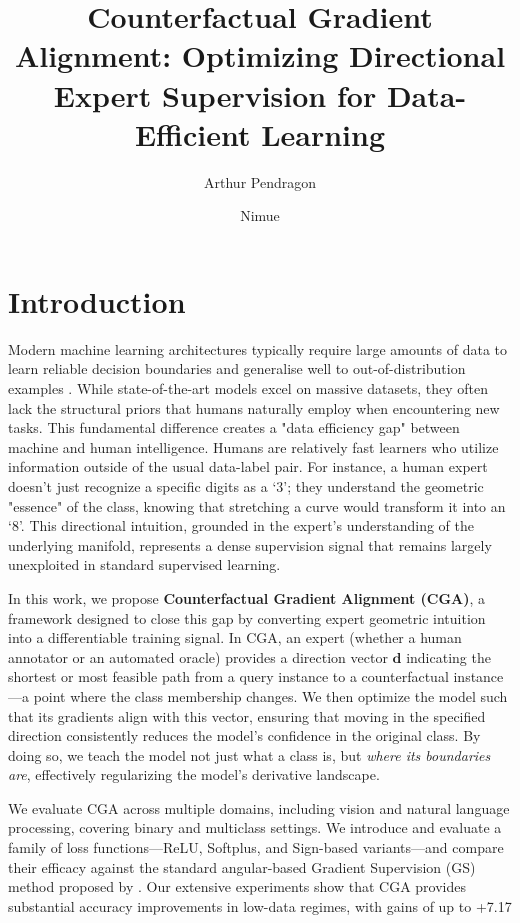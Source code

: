 \documentclass[sigconf,anonymous]{aamas}
\title[Counterfactual Gradient Alignment]{Counterfactual Gradient Alignment: Optimizing Directional Expert Supervision for Data-Efficient Learning}
\author{Arthur Pendragon}
\affiliation{
  \institution{Camelot Castle}
  \city{Camelot}
  \country{United Kingdom}}
\author{Nimue}
\affiliation{
  \institution{The Lady's Lake}
  \city{Avalon}
  \country{United Kingdom}}
\begin{document}
\pagestyle{fancy}
\fancyhead{}

\maketitle 

\section{Introduction}
Modern machine learning architectures typically require large amounts of data to learn reliable decision boundaries and generalise well to out-of-distribution examples \cite{hand_classifier, Challen231, souza2020challenges}. While state-of-the-art models excel on massive datasets, they often lack the structural priors that humans naturally employ when encountering new tasks. This fundamental difference creates a "data efficiency gap" between machine and human intelligence. Humans are relatively fast learners who utilize information outside of the usual data-label pair. For instance, a human expert doesn't just recognize a specific digits as a `3'; they understand the geometric "essence" of the class, knowing that stretching a curve would transform it into an `8'. This directional intuition, grounded in the expert's understanding of the underlying manifold, represents a dense supervision signal that remains largely unexploited in standard supervised learning.

In this work, we propose \textbf{Counterfactual Gradient Alignment (CGA)}, a framework designed to close this gap by converting expert geometric intuition into a differentiable training signal. In CGA, an expert (whether a human annotator or an automated oracle) provides a direction vector $\mathbf{d}$ indicating the shortest or most feasible path from a query instance to a counterfactual instance---a point where the class membership changes. We then optimize the model such that its gradients align with this vector, ensuring that moving in the specified direction consistently reduces the model's confidence in the original class. By doing so, we teach the model not just what a class is, but \emph{where its boundaries are}, effectively regularizing the model's derivative landscape.

We evaluate CGA across multiple domains, including vision and natural language processing, covering binary and multiclass settings. We introduce and evaluate a family of loss functions---ReLU, Softplus, and Sign-based variants---and compare their efficacy against the standard angular-based Gradient Supervision (GS) method proposed by \cite{teney2020learning}. Our extensive experiments show that CGA provides substantial accuracy improvements in low-data regimes, with gains of up to +7.17%
\end{document}
